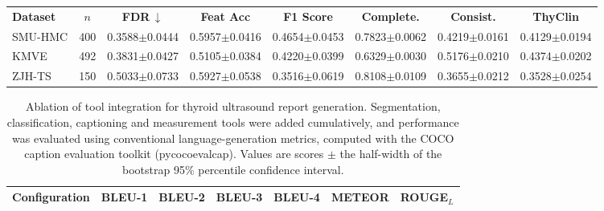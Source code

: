 \documentclass[fleqn,10pt]{wlscirep}
\begin{document}
\begin{appendices}
\begin{table}[p]
\begin{threeparttable}
\vspace{0.8em}

\begin{tabular}{lccccccc}
\toprule
\rowcolor{gray!20}
\multicolumn{8}{c}{\textbf{Clinical semantic metrics}} \\
\midrule
\textbf{Dataset}
& \textbf{\(n\)}
& \textbf{FDR}\,$\downarrow$
& \textbf{Feat Acc}
& \textbf{F1 Score}
& \textbf{Complete.}
& \textbf{Consist.}
& \textbf{ThyClin} \\
\midrule
SMU-HMC
& 400
& 0.3588$\pm$0.0444
& 0.5957$\pm$0.0416
& 0.4654$\pm$0.0453
& 0.7823$\pm$0.0062
& 0.4219$\pm$0.0161
& 0.4129$\pm$0.0194 \\
KMVE
& 492
& 0.3831$\pm$0.0427
& 0.5105$\pm$0.0384
& 0.4220$\pm$0.0399
& 0.6329$\pm$0.0030
& 0.5176$\pm$0.0210
& 0.4374$\pm$0.0202 \\
ZJH-TS
& 150
& 0.5033$\pm$0.0733
& 0.5927$\pm$0.0538
& 0.3516$\pm$0.0619
& 0.8108$\pm$0.0109
& 0.3655$\pm$0.0212
& 0.3528$\pm$0.0254 \\
\bottomrule
\end{tabular}

\end{threeparttable}
\end{table}
\clearpage

\begin{table}[p]
\centering
\begin{threeparttable}

\caption{Ablation of tool integration for thyroid ultrasound report generation. Segmentation, classification, captioning and measurement tools were added cumulatively, and performance was evaluated using conventional language-generation metrics, computed with the COCO caption evaluation toolkit (pycocoevalcap). Values are scores $\pm$ the half-width of the bootstrap 95\% percentile confidence interval.}
\label{tab:report_generation_tool_ablation}

\footnotesize
\setlength{\tabcolsep}{5.0pt}
\renewcommand{\arraystretch}{1.08}

\begin{tabular}{lcccccc}
\toprule
\textbf{Configuration}
& \textbf{BLEU-1}
& \textbf{BLEU-2}
& \textbf{BLEU-3}
& \textbf{BLEU-4}
& \textbf{METEOR}
& \textbf{ROUGE$_L$} \\
\midrule


\end{tabular}
\end{threeparttable}
\end{table}
\end{appendices}
\end{document}
